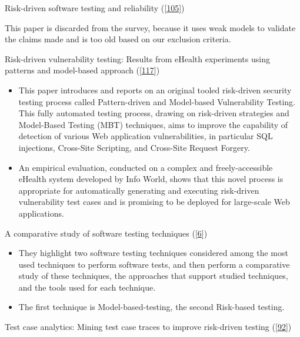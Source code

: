 \documentclass[]{book}
\providecommand{\tightlist}{%
  \setlength{\itemsep}{0pt}\setlength{\parskip}{0pt}}
\begin{document}
Risk-driven software testing and reliability
({[}\protect\hyperlink{ref-schneidewind2007}{105}{]})

This paper is discarded from the survey, because it uses weak models to
validate the claims made and is too old based on our exclusion criteria.

Risk-driven vulnerability testing: Results from eHealth experiments
using patterns and model-based approach
({[}\protect\hyperlink{ref-vernotte2015}{117}{]})

\begin{itemize}
\tightlist
\item
  This paper introduces and reports on an original tooled risk-driven
  security testing process called Pattern-driven and Model-based
  Vulnerability Testing. This fully automated testing process, drawing
  on risk-driven strategies and Model-Based Testing (MBT) techniques,
  aims to improve the capability of detection of various Web application
  vulnerabilities, in particular SQL injections, Cross-Site Scripting,
  and Cross-Site Request Forgery.
\item
  An empirical evaluation, conducted on a complex and freely-accessible
  eHealth system developed by Info World, shows that this novel process
  is appropriate for automatically generating and executing risk-driven
  vulnerability test cases and is promising to be deployed for
  large-scale Web applications.
\end{itemize}

A comparative study of software testing techniques
({[}\protect\hyperlink{ref-atifi2017}{6}{]})

\begin{itemize}
\tightlist
\item
  They highlight two software testing techniques considered among the
  most used techniques to perform software tests, and then perform a
  comparative study of these techniques, the approaches that support
  studied techniques, and the tools used for each technique.
\item
  The first technique is Model-based-testing, the second Risk-based
  testing.
\end{itemize}

Test case analytics: Mining test case traces to improve risk-driven
testing ({[}\protect\hyperlink{ref-noor2015test}{92}{]})
\end{document}
